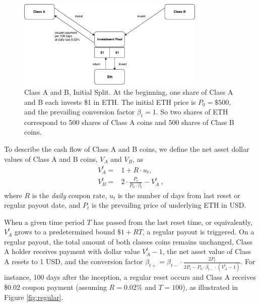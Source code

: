 \documentclass[final,pdftex]{ectaart}
\theoremstyle{plain}
\begin{document}
\begin{figure}[hb]
	\centering
	\includegraphics[width=0.8\textwidth]{initial}
	\caption{Class A and B, Initial Split. At the beginning, one share of Class A and B each invests \$1 in ETH. The initial ETH price is $P_0=\$500$, and the prevailing conversion factor $\beta_t=1$. So two shares of ETH correspond to 500 shares of Class A coins and 500 shares of Class B coins.}\label{fig:initial}
\end{figure}

To describe the cash flow of Class A and B coins, we define the net asset dollar values of Class A and B coins, $V_A$ and $V_B$, as
\begin{equation}
\begin{array}{ll}
V_{A}^{t}= & 1+R\cdot u_t,\\
V_{B}^{t}= & 2\cdot\frac{P_{t}}{P_{0}\cdot\beta_t}-V_{A}^{t}\ ,
\end{array}\label{eq:netvalue}
\end{equation}
where $R$ is the \emph{daily} coupon rate, $u_t$ is the number of days from last reset or regular payout date, and $P_{t}$ is the prevailing price of underlying ETH in USD.

When a given time period $T$ has passed from the last reset time, or equivalently, $V_{A}^{t}$ grows to a predetermined bound $\$1+RT$, a regular payout is triggered. On a regular payout, the total amount of both classes coins remains unchanged, Class A holder receives payment with dollar value $V_{A}^{t}-1$, the net asset value of Class A resets to 1 USD, and the conversion factor $\beta_{t+}=\beta_{t-}\cdot\frac{2P_{t}}{2P_{t}-P_{0}\cdot\beta_{t-}\cdot\left(V_{A}^{t}-1\right)}$. For instance, 100 days after the inception, a regular reset occurs and Class A receives \$0.02 coupon payment (assuming $R=0.02\%$ and $T=100$), as illustrated in Figure \ref{fig:regular}.
\end{document}
